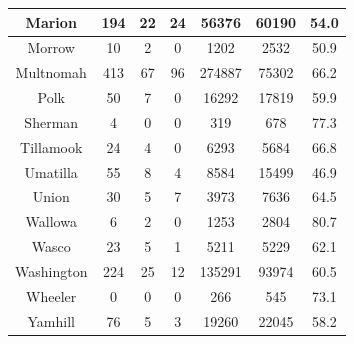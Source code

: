 \documentclass[
  english,
  man]{apa6}
\begin{document}
\begin{table}
\begin{tabular}[t]{c|c|c|c|c|c|c}
\hline
Marion & 194 & 22 & 24 & 56376 & 60190 & 54.0\\
\hline
Morrow & 10 & 2 & 0 & 1202 & 2532 & 50.9\\
\hline
Multnomah & 413 & 67 & 96 & 274887 & 75302 & 66.2\\
\hline
Polk & 50 & 7 & 0 & 16292 & 17819 & 59.9\\
\hline
Sherman & 4 & 0 & 0 & 319 & 678 & 77.3\\
\hline
Tillamook & 24 & 4 & 0 & 6293 & 5684 & 66.8\\
\hline
Umatilla & 55 & 8 & 4 & 8584 & 15499 & 46.9\\
\hline
Union & 30 & 5 & 7 & 3973 & 7636 & 64.5\\
\hline
Wallowa & 6 & 2 & 0 & 1253 & 2804 & 80.7\\
\hline
Wasco & 23 & 5 & 1 & 5211 & 5229 & 62.1\\
\hline
Washington & 224 & 25 & 12 & 135291 & 93974 & 60.5\\
\hline
Wheeler & 0 & 0 & 0 & 266 & 545 & 73.1\\
\hline
Yamhill & 76 & 5 & 3 & 19260 & 22045 & 58.2\\
\hline
\end{tabular}
\end{table}
\end{document}
